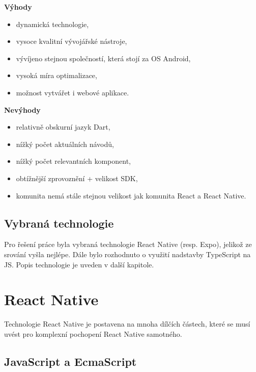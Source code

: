 \textbf{Výhody}

\begin{itemize}
	\item dynamická technologie,
	\item vysoce kvalitní vývojářské nástroje,
	\item vývíjeno stejnou společností, která stojí za OS Android,
	\item vysoká míra optimalizace,
	\item možnost vytvářet i webové aplikace.
\end{itemize}

\textbf{Nevýhody}

\begin{itemize}
	\item relativně obskurní jazyk Dart,
	\item nížký počet aktuálních návodů,
	\item nížký počet relevantních komponent,
	\item obtížnější zprovoznění + velikost SDK,
	\item komunita nemá stále stejnou velikost jak komunita React a React Native.
\end{itemize}

\subsection{Vybraná technologie}

Pro řešení práce byla vybraná technologie React Native (resp. Expo), jelikož ze srování vyšla nejlépe. Dále bylo rozhodnuto o využití nadstavby TypeScript na JS. Popis technologie je uveden v další kapitole.

\section{React Native}

Technologie React Native je postavena na mnoha dílčích částech, které se musí uvést pro komplexní pochopení React Native samotného.

\subsection{JavaScript a EcmaScript}


